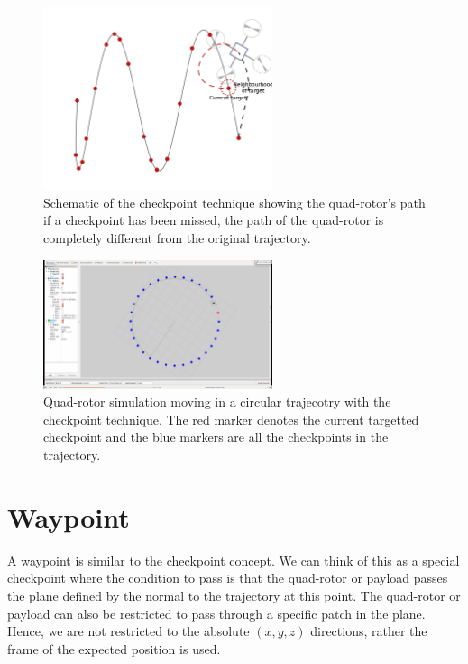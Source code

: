 \documentclass[BTech]{iitmdiss}
\begin{document}
\begin{figure}[h]
  \centering
    \includegraphics[width=0.6\textwidth]{checkpoint_con.png}
    \caption{Schematic of the checkpoint technique showing the quad-rotor's path if a checkpoint has been missed, the path of the quad-rotor is completely different from the original trajectory.}
\end{figure}

\begin{figure}[h]
  \centering
    \includegraphics[width=0.6\textwidth]{checkpoint_circle.png}
    \caption{Quad-rotor simulation moving in a circular trajecotry with the checkpoint technique. The red marker denotes the current targetted checkpoint and the blue markers are all the checkpoints in the trajectory.}
\end{figure}

\section{Waypoint}

A waypoint is similar to the checkpoint concept. We can think of this as a special checkpoint where the condition to pass is that the quad-rotor or payload passes the plane defined by the normal to the trajectory at this point. The quad-rotor or payload can also be restricted to pass through a specific patch in the plane. Hence, we are not restricted to the absolute $(x, y, z)$ directions, rather the frame of the expected position is used.
\end{document}
